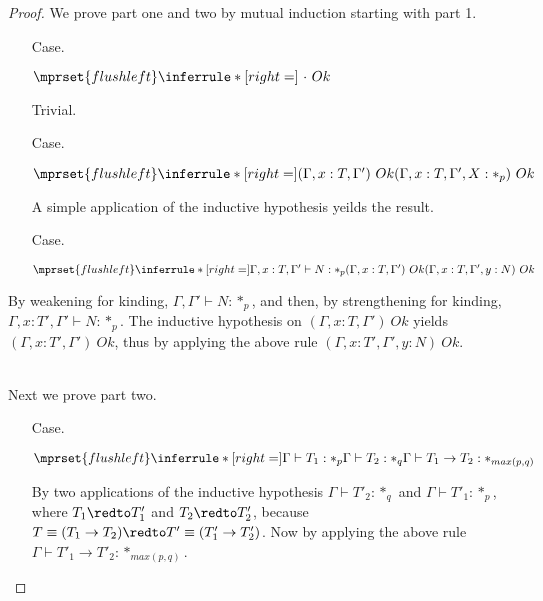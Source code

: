 \begin{proof}
  We prove part one and two by mutual induction starting with part 1.
\begin{itemize}
\item[Case.] \ \\
  \begin{center}
    \begin{math}
      $$\mprset{flushleft}
      \inferrule* [right=] {
        \   
      }{\cdot\ Ok}
    \end{math}
  \end{center}
  Trivial.

\item[Case.]\ \\
  \begin{center}
    \begin{math}
      $$\mprset{flushleft}
      \inferrule* [right=] {
        (\Gamma,x:T,\Gamma')\ Ok
      }{(\Gamma,x:T,\Gamma',X:*_p)\ Ok}
    \end{math}
  \end{center}
  A simple application of the inductive hypothesis yeilds the result.

\item[Case.]\ \\
  \begin{center}
    \begin{math}
      $$\mprset{flushleft}
      \inferrule* [right=] {
        \Gamma,x:T,\Gamma' \vdash N:*_p
        \\
        (\Gamma,x:T,\Gamma')\ Ok
      }{(\Gamma,x :T,\Gamma',y:N)\ Ok}
    \end{math} 
  \end{center}
\end{itemize}
By weakening for kinding, $\Gamma,\Gamma' \vdash N:*_p$, and then, by strengthening for kinding, $\Gamma,x:T',\Gamma' \vdash N:*_p$.
The inductive hypothesis on $(\Gamma,x:T,\Gamma')\ Ok$ yields $(\Gamma,x:T',\Gamma')\ Ok$, thus by applying the above rule
$(\Gamma,x :T',\Gamma',y:N)\ Ok$.

\ \\
\noindent
Next we prove part two.
\begin{itemize}
\item[Case.] \ \\
  \begin{center}
    \begin{math}
      $$\mprset{flushleft}
      \inferrule* [right=] {
        \Gamma \vdash T_1 : *_p
        \\
        \Gamma \vdash T_2 : *_q
      }{\Gamma \vdash T_1 \rightarrow T_2 : *_{max(p,q)}}
    \end{math}
  \end{center}
  By two applications of the inductive hypothesis $\Gamma \vdash T'_2 : *_q$ and
  $\Gamma \vdash T'_1 : *_p$, where $T_1 \redto T'_1$ and $T_2 \redto T'_2$, because
  $T \equiv (T_1 \to T_2) \redto T' \equiv (T'_1 \to T'_2)$.  Now by applying
  the above rule $\Gamma \vdash T'_1 \to T'_2 : *_{max(p,q)}$. 


\end{itemize}
\end{proof}
